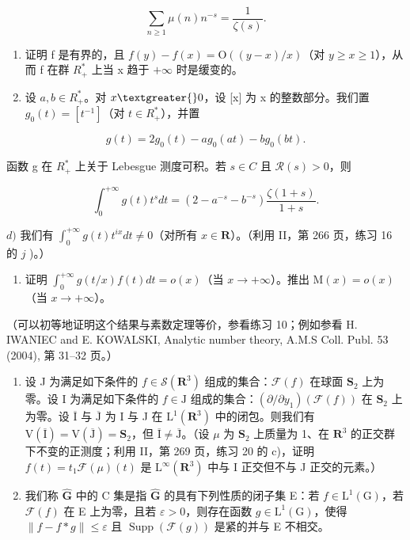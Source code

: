 \[
\sum_ {n \geqslant 1} \mu (n) n ^ {- s} = \frac {1}{\zeta (s)}.
\]

\begin{enumerate}
\def\labelenumi{\alph{enumi})}
\setcounter{enumi}{1}
\item
  证明 f 是有界的，且 \(f(y) - f(x) = \mathrm{O}((y - x)/x)\)（对 \(y \geqslant x \geqslant 1\)），从而 f 在群 \(R_{+}^{*}\) 上当 x 趋于 \(+\infty\) 时是缓变的。
\item
  设 \(a, b \in R_{+}^{*}\)。对 \(x \textgreater{} 0\)，设 {[}x{]} 为 x 的整数部分。我们置 \(g_{0}(t) = [t^{-1}]\)（对 \(t \in R_{+}^{*}\)），并置
\end{enumerate}

\[
g (t) = 2 g _ {0} (t) - a g _ {0} (a t) - b g _ {0} (b t).
\]

函数 g 在 \(R_{+}^{*}\) 上关于 Lebesgue 测度可积。若 \(s \in C\) 且 \(\mathcal{R}(s) > 0\)，则

\[
\int_ {0} ^ {+ \infty} g (t) t ^ {s} d t = (2 - a ^ {- s} - b ^ {- s}) \frac {\zeta (1 + s)}{1 + s}.
\]

\(d)\) 我们有 \(\int_{0}^{+\infty} g(t)t^{ix} dt \neq 0\)（对所有 \(x \in \mathbf{R}\)）。（利用 II，第 266 页，练习 16 的 \(j\) )。）

\begin{enumerate}
\def\labelenumi{\alph{enumi})}
\setcounter{enumi}{4}
\tightlist
\item
  证明 \(\int_0^{+\infty} g(t / x)f(t)dt = o(x)\)（当 \(x \to +\infty\)）。推出 \(\mathrm{M}(x) = o(x)\)（当 \(x \to +\infty\)）。
\end{enumerate}

（可以初等地证明这个结果与素数定理等价，参看练习 10；例如参看 H. IWANIEC and E. KOWALSKI, Analytic number theory, A.M.S Coll. Publ. 53 (2004), 第 31--32 页。）

\begin{enumerate}
\def\labelenumi{\arabic{enumi})}
\setcounter{enumi}{11}
\item
  设 J 为满足如下条件的 \(f \in \mathcal{S}(\mathbf{R}^3)\) 组成的集合：\(\mathcal{F}(f)\) 在球面 \(\mathbf{S}_2\) 上为零。设 I 为满足如下条件的 \(f \in \mathrm{J}\) 组成的集合：\((\partial/\partial y_1)(\mathcal{F}(f))\) 在 \(\mathbf{S}_2\) 上为零。设 \(\overline{\mathrm{I}}\) 与 \(\overline{\mathrm{J}}\) 为 I 与 J 在 \(\mathrm{L}^1(\mathbf{R}^3)\) 中的闭包。则我们有 \(\mathrm{V}(\overline{\mathrm{I}}) = \mathrm{V}(\overline{\mathrm{J}}) = \mathbf{S}_2\)，但 \(\overline{\mathrm{I}} \neq \overline{\mathrm{J}}\)。（设 \(\mu\) 为 \(\mathbf{S}_2\) 上质量为 1、在 \(\mathbf{R}^3\) 的正交群下不变的正测度；利用 II，第 269 页，练习 20 的 c)，证明 \(f(t) = t_1\mathcal{F}(\mu)(t)\) 是 \(\mathrm{L}^\infty(\mathbf{R}^3)\) 中与 I 正交但不与 J 正交的元素。）
\item
  我们称 \(\widehat{\mathbf{G}}\) 中的 C 集是指 \(\widehat{\mathbf{G}}\) 的具有下列性质的闭子集 E：若 \(f\in \mathrm{L}^{1}(\mathrm{G})\)，若 \(\mathcal{F}(f)\) 在 E 上为零，且若 \(\varepsilon >0\)，则存在函数 \(g\in \mathrm{L}^{1}(\mathrm{G})\)，使得 \(\| f - f*g\| \leqslant \varepsilon\) 且 \(\operatorname {Supp}(\mathcal{F}(g))\) 是紧的并与 E 不相交。
\end{enumerate}

